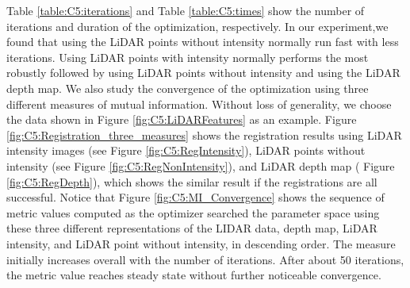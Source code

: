 Table  \ref{table:C5:iterations} and Table  \ref{table:C5:times} show the number of iterations and duration of the optimization, respectively. In our experiment,we found that using the LiDAR points without intensity normally run fast with less iterations. Using LiDAR points with intensity normally performs the most robustly followed by using LiDAR points without intensity and using the LiDAR depth map. We also study the convergence of the optimization using three different measures of mutual information. Without loss of generality, 
we choose the data shown in Figure \ref{fig:C5:LiDARFeatures} as an example. Figure \ref{fig:C5:Registration_three_measures} shows the registration results using LiDAR intensity images (see  Figure \ref{fig:C5:RegIntensity}), LiDAR points without intensity (see Figure \ref{fig:C5:RegNonIntensity}), and LiDAR depth map ( Figure \ref{fig:C5:RegDepth}), which shows the similar result if the registrations are all successful. Notice that Figure \ref{fig:C5:MI_Convergence} shows the sequence of metric values computed as the optimizer searched the parameter space using these three different representations of the LIDAR data, depth map, LiDAR intensity, and LiDAR point without intensity, in descending order. The measure initially increases overall with the number of iterations. After about 50 iterations, the metric value reaches steady state without further noticeable convergence.

